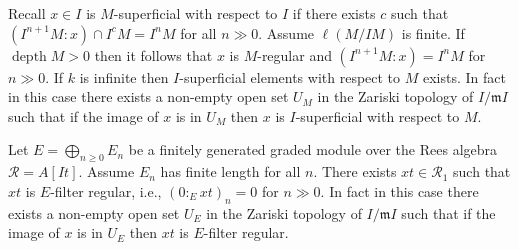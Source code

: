 \documentclass{amsart}
\newcommand{\m}{\mathfrak{m} }
\newcommand{\R}{\mathcal{R} }
\newcommand{\depth}{\operatorname{depth}}
\theoremstyle{plain}
\theoremstyle{definition}
\theoremstyle{remark}
\begin{document}
\s Recall $x \in I$ is $M$-superficial with respect to $I$ if there exists $c$ such that $(I^{n+1}M \colon x) \cap I^cM = I^nM$ for all $n \gg 0$. Assume $\ell(M/IM)$ is finite. If $\depth M > 0$ then it follows that $x$ is $M$-regular and $(I^{n+1}M \colon x) = I^nM$ for $n \gg 0$. If $k$ is infinite then $I$-superficial elements with respect to $M$ exists. In fact in this case there exists a non-empty open set $U_M$ in the Zariski topology of $I/\m I$ such that if the image of $x$ is in $U_M$ then $x$ is $I$-superficial with respect to $M$.

\s Let $E = \bigoplus_{n \geq 0}E_n$ be a finitely generated graded module over the Rees algebra $\R= A[It]$. Assume $E_n$ has finite length for all $n$. There exists $xt \in \R_1$ such that $xt$ is $E$-filter regular, i.e.,  $(0 \colon_E xt)_n = 0$ for $n \gg 0$. In fact in this case there exists a non-empty open set $U_E$ in the Zariski topology of $I/\m I$ such that if the image of $x$ is in $U_E$ then $xt$ is $E$-filter regular.
\end{document}
